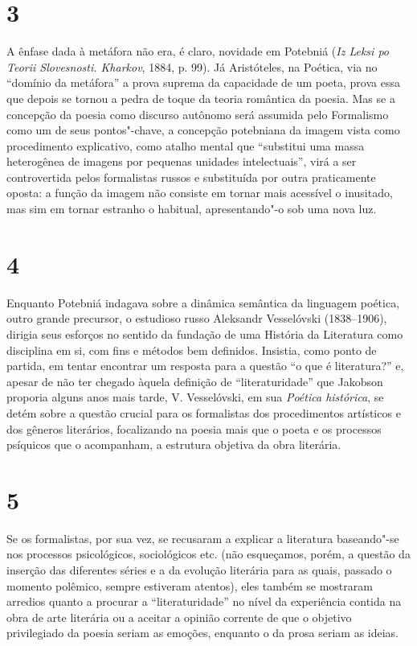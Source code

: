 \section{3}

A ênfase dada à metáfora não era, é claro, novidade em Potebniá
(\emph{Iz Leksi po Teorii Slovesnosti. Kharkov}, 1884, p. 99). Já
Aristóteles, na Poética, via no ``domínio da metáfora'' a prova suprema
da capacidade de um poeta, prova essa que depois se tornou a pedra de
toque da teoria romântica da poesia. Mas se a concepção da poesia como
discurso autônomo será assumida pelo Formalismo como um de seus
pontos"-chave, a concepção potebniana da imagem vista como procedimento
explicativo, como atalho mental que ``substitui uma massa heterogênea de
imagens por pequenas unidades intelectuais'', virá a ser controvertida
pelos formalistas russos e substituída por outra praticamente oposta: a
função da imagem não consiste em tornar mais acessível o inusitado, mas
sim em tornar estranho o habitual, apresentando"-o sob uma nova luz.

\section{4}

Enquanto Potebniá indagava sobre a dinâmica semântica da linguagem
poética, outro grande precursor, o estudioso russo Aleksandr Vesselóvski
(1838--1906), dirigia seus esforços no sentido da fundação de uma
História da Literatura como disciplina em si, com fins e métodos bem
definidos. Insistia, como ponto de partida, em tentar encontrar um
resposta para a questão ``o que é literatura?'' e, apesar de não ter
chegado àquela definição de ``literaturidade'' que Jakobson proporia alguns
anos mais tarde, V. Vesselóvski, em sua \emph{Poética histórica}, se
detém sobre a questão crucial para os formalistas dos procedimentos
artísticos e dos gêneros literários, focalizando na poesia mais que o
poeta e os processos psíquicos que o acompanham, a estrutura objetiva da obra literária.

\section{5}

Se os formalistas, por sua vez, se recusaram a explicar a literatura
baseando"-se nos processos psicológicos, sociológicos etc. (não
esqueçamos, porém, a questão da inserção das diferentes séries e a da
evolução literária para as quais, passado o momento polêmico, sempre
estiveram atentos), eles também se mostraram arredios quanto a procurar
a ``literaturidade'' no nível da experiência contida na obra de arte
literária ou a aceitar a opinião corrente de que o objetivo privilegiado
da poesia seriam as emoções, enquanto o da prosa seriam as ideias.

